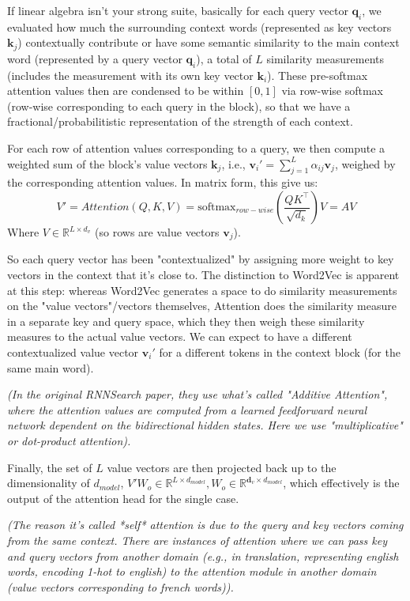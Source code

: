 \documentclass[11pt]{article}
\newcommand{\vd}{{\mathbf{d}}}
\newcommand{\vk}{{\mathbf{k}}}
\newcommand{\vq}{{\mathbf{q}}}
\newcommand{\vv}{{\mathbf{v}}}
\newcommand{\trs}{{\top}}
\newcommand{\RR}{\mathbb{R}} %
\begin{document}
If linear algebra isn't your strong suite, basically for each query vector $\vq_i$, we evaluated how much the surrounding context words (represented as key vectors $\vk_j$) contextually contribute or have some semantic similarity to the main context word (represented by a query vector $\vq_i$), a total of $L$ similarity measurements (includes the measurement with its own key vector $\vk_i$). These pre-softmax attention values then are condensed to be within $[0, 1]$ via row-wise softmax (row-wise corresponding to each query in the block), so that we have a fractional/probabilitistic representation of the strength of each context.

For each row of attention values corresponding to a query, we then compute a weighted sum of the block's value vectors $\vk_j$, i.e., $\vv_i' = \sum_{j=1}^{L}\alpha_{ij}\vv_j$, weighed by the corresponding attention values. In matrix form, this give us:
$$V' = Attention(Q, K, V) = \mbox{softmax}_{row-wise}\left(\frac{QK^\trs}{\sqrt{d_k}}\right)V = AV$$
Where $V \in \RR^{L \times d_v}$ (so rows are value vectors $\vv_j$).


So each query vector has been "contextualized" by assigning more weight to key vectors in the context that it's close to. The distinction to Word2Vec is apparent at this step: whereas Word2Vec generates a space to do similarity measurements on the "value vectors"/vectors themselves, Attention does the similarity measure in a separate key and query space, which they then weigh these similarity measures to the actual value vectors. We can expect to have a different contextualized value vector $\vv_i'$ for a different tokens in the context block (for the same main word).

\textit{(In the original RNNSearch paper, they use what's called "Additive Attention", where the attention values are computed from a learned feedforward neural network dependent on the bidirectional hidden states. Here we use "multiplicative" or dot-product attention).}


Finally, the set of $L$ value vectors are then projected back up to the dimensionality of $d_{model}$, $V'W_o \in \RR^{L \times d_{model}}, W_o \in \RR^{\vd_v \times d_{model}}$, which effectively is the output of the attention head for the single case. 

\textit{(The reason it's called *self* attention is due to the query and key vectors coming from the same context. There are instances of attention where we can pass key and query vectors from another domain (e.g., in translation, representing english words, encoding 1-hot to english) to the attention module in another domain (value vectors corresponding to french words)).}
\end{document}
